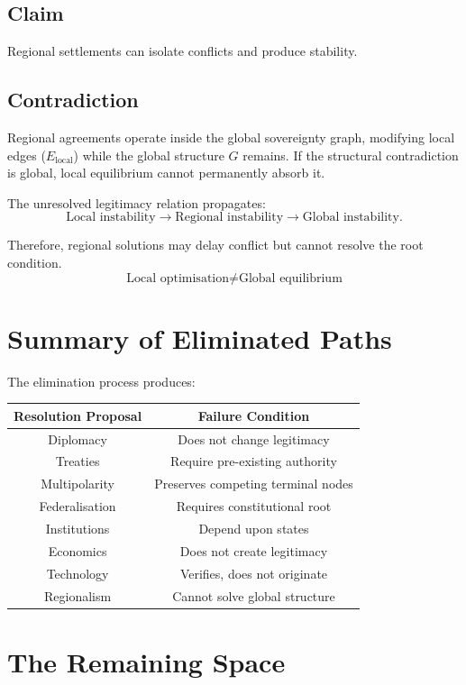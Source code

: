 \documentclass[11pt,openany]{book}
\theoremstyle{plain}
\theoremstyle{definition}
\begin{document}
\subsection*{Claim}

Regional settlements can isolate conflicts and produce stability.

\subsection*{Contradiction}

Regional agreements operate inside the global sovereignty graph, modifying local edges (\(E_{\text{local}}\)) while the global structure \(G\) remains. If the structural contradiction is global, local equilibrium cannot permanently absorb it. 

The unresolved legitimacy relation propagates:
\[
\text{Local instability} \longrightarrow \text{Regional instability} \longrightarrow \text{Global instability}.
\]

Therefore, regional solutions may delay conflict but cannot resolve the root condition.
\[
\boxed{
\text{Local optimisation} \neq \text{Global equilibrium}
}
\]

\section*{Summary of Eliminated Paths}

The elimination process produces:
\begin{center}
\begin{tabular}{|c|c|}
\hline
\textbf{Resolution Proposal} & \textbf{Failure Condition} \\
\hline
Diplomacy & Does not change legitimacy \\
Treaties & Require pre-existing authority \\
Multipolarity & Preserves competing terminal nodes \\
Federalisation & Requires constitutional root \\
Institutions & Depend upon states \\
Economics & Does not create legitimacy \\
Technology & Verifies, does not originate \\
Regionalism & Cannot solve global structure \\
\hline
\end{tabular}
\end{center}

\section*{The Remaining Space}
\end{document}
